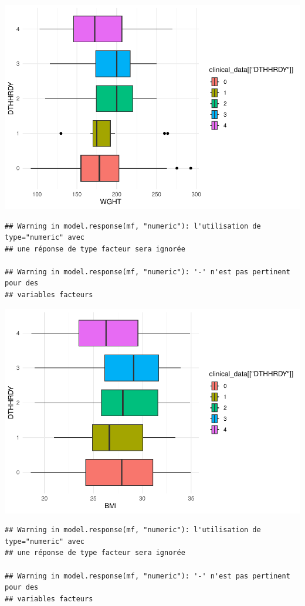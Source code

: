 \documentclass[
]{article}
\begin{document}
\includegraphics{Q1_markdown_files/figure-latex/unnamed-chunk-8-10.pdf}

\begin{verbatim}
## Warning in model.response(mf, "numeric"): l'utilisation de type="numeric" avec
## une réponse de type facteur sera ignorée

## Warning in model.response(mf, "numeric"): '-' n'est pas pertinent pour des
## variables facteurs
\end{verbatim}

\includegraphics{Q1_markdown_files/figure-latex/unnamed-chunk-8-11.pdf}

\begin{verbatim}
## Warning in model.response(mf, "numeric"): l'utilisation de type="numeric" avec
## une réponse de type facteur sera ignorée

## Warning in model.response(mf, "numeric"): '-' n'est pas pertinent pour des
## variables facteurs
\end{verbatim}
\end{document}
